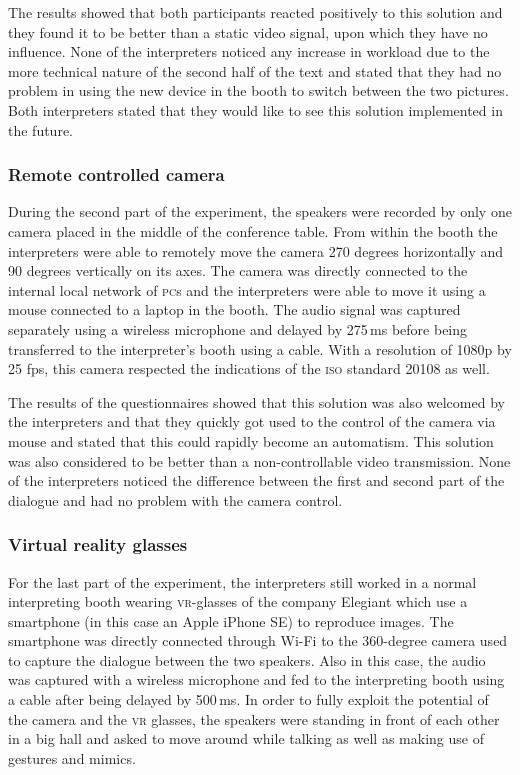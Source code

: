 \documentclass[output=paper]{langsci/langscibook}
\begin{document}
The results showed that both participants reacted positively to this solution and they found it to be better than a static video signal, upon which they have no influence. None of the interpreters noticed any increase in workload due to the more technical nature of the second half of the text and stated that they had no problem in using the new device in the booth to switch between the two pictures. Both interpreters stated that they would like to see this solution implemented in the future.

\subsubsection{Remote controlled camera}

During the second part of the experiment, the speakers were recorded by only one camera placed in the middle of the conference table. From within the booth the interpreters were able to remotely move the camera 270 degrees horizontally and 90 degrees vertically on its axes. The camera was directly connected to the internal local network of \textsc{pc}s and the interpreters were able to move it using a mouse connected to a laptop in the booth. The audio signal was captured separately using a wireless microphone and delayed by 275\,ms before being transferred to the interpreter’s booth using a cable. With a resolution of 1080p by 25 fps, this camera respected the indications of the \textsc{iso} standard 20108 as well. 

The results of the questionnaires showed that this solution was also welcomed by the interpreters and that they quickly got used to the control of the camera via mouse and stated that this could rapidly become an automatism. This solution was also considered to be better than a non-controllable video transmission. None of the interpreters noticed the difference between the first and second part of the dialogue and had no problem with the camera control.

\subsubsection{Virtual reality glasses}
\largerpage
For the last part of the experiment, the interpreters still worked in a normal interpreting booth wearing \textsc{vr}-glasses of the company Elegiant which use a smartphone (in this case an Apple iPhone SE) to reproduce images. The smartphone was directly connected through Wi-Fi to the 360-degree camera used to capture the dialogue between the two speakers. Also in this case, the audio was captured with a wireless microphone and fed to the interpreting booth using a cable after being delayed by 500\,ms. In order to fully exploit the potential of the camera and the \textsc{vr} glasses, the speakers were standing in front of each other in a big hall and asked to move around while talking as well as making use of gestures and mimics.
\end{document}
